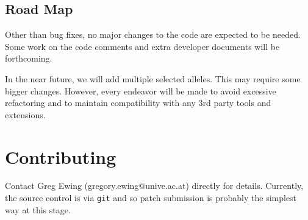 \documentclass{article}
\begin{document}
\subsection{Road Map}

Other than bug fixes, no major changes to the code are expected to be needed.
Some work on the code comments and extra developer documents will be
forthcoming. 

In the near future, we will add multiple selected alleles. This may require some
bigger changes. However, every endeavor will be made to avoid excessive
refactoring and to maintain compatibility with any 3rd party tools and
extensions. 

\section{Contributing}

Contact Greg Ewing (gregory.ewing@unive.ac.at) directly for details.
Currently, the source control is via {\tt git} and so patch submission is
probably the simplest way at this stage.


 
 
\end{document}
